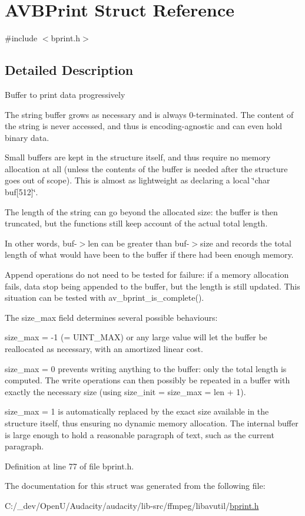 \hypertarget{struct_a_v_b_print}{}\section{A\+V\+B\+Print Struct Reference}
\label{struct_a_v_b_print}


{\ttfamily \#include $<$bprint.\+h$>$}



\subsection{Detailed Description}
Buffer to print data progressively

The string buffer grows as necessary and is always 0-\/terminated. The content of the string is never accessed, and thus is encoding-\/agnostic and can even hold binary data.

Small buffers are kept in the structure itself, and thus require no memory allocation at all (unless the contents of the buffer is needed after the structure goes out of scope). This is almost as lightweight as declaring a local \char`\"{}char buf\mbox{[}512\mbox{]}\char`\"{}.

The length of the string can go beyond the allocated size\+: the buffer is then truncated, but the functions still keep account of the actual total length.

In other words, buf-\/$>$len can be greater than buf-\/$>$size and records the total length of what would have been to the buffer if there had been enough memory.

Append operations do not need to be tested for failure\+: if a memory allocation fails, data stop being appended to the buffer, but the length is still updated. This situation can be tested with av\+\_\+bprint\+\_\+is\+\_\+complete().

The size\+\_\+max field determines several possible behaviours\+:

size\+\_\+max = -\/1 (= U\+I\+N\+T\+\_\+\+M\+AX) or any large value will let the buffer be reallocated as necessary, with an amortized linear cost.

size\+\_\+max = 0 prevents writing anything to the buffer\+: only the total length is computed. The write operations can then possibly be repeated in a buffer with exactly the necessary size (using size\+\_\+init = size\+\_\+max = len + 1).

size\+\_\+max = 1 is automatically replaced by the exact size available in the structure itself, thus ensuring no dynamic memory allocation. The internal buffer is large enough to hold a reasonable paragraph of text, such as the current paragraph. 

Definition at line 77 of file bprint.\+h.



The documentation for this struct was generated from the following file\+:\begin{DoxyCompactItemize}
\item 
C\+:/\+\_\+dev/\+Open\+U/\+Audacity/audacity/lib-\/src/ffmpeg/libavutil/\hyperlink{bprint_8h}{bprint.\+h}\end{DoxyCompactItemize}
